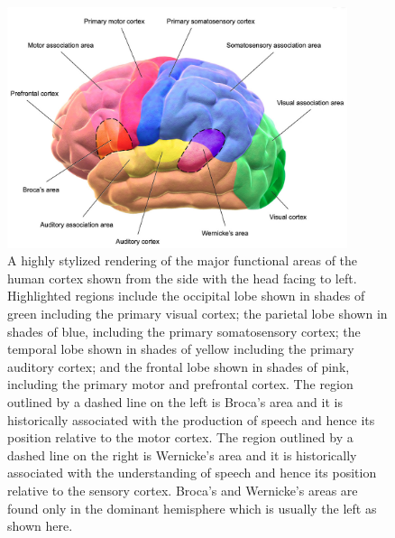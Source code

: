 \documentclass[letterpaper,11pt]{article}
\def\urlh#1{{}}
\begin{document}

\begin{figure}
%
  \begin{center} 
    \includegraphics[height=200pt]{./figures/Human_Brain_Neocortex_Function.jpg} 
  \end{center}
%
  \caption{A highly stylized rendering of the major functional areas of the human cortex shown from the side with the head facing to left. Highlighted regions include the occipital lobe shown in shades of green including the primary visual cortex; the parietal lobe shown in shades of blue, including the primary somatosensory cortex; the temporal lobe shown in shades of yellow including the primary auditory cortex; and the frontal lobe shown in shades of pink, including the primary motor and prefrontal cortex. The region outlined by a dashed line on the left is Broca's area and it is historically associated with the production of speech and hence its position relative to the motor cortex. The region outlined by a dashed line on the right is Wernicke’s area and it is historically associated with the understanding of speech and hence its position relative to the sensory cortex. Broca's and Wernicke's areas are found only in the dominant hemisphere which is usually the left as shown here.}
%
  \label{fig_necortex}
%
\end{figure}
\end{document}
